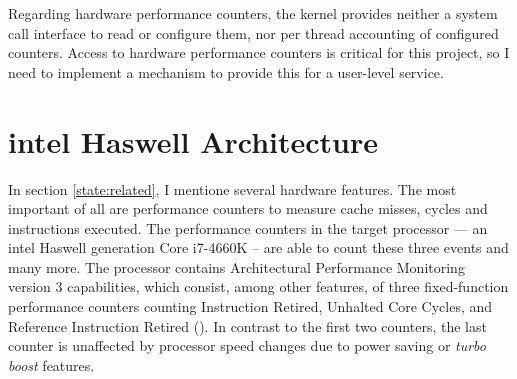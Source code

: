 Regarding hardware performance counters, the kernel provides neither a system
call interface to read or configure them, nor per thread accounting of
configured counters.
Access to hardware performance counters is critical for this project, so I need
to implement a mechanism to provide this for a user-level service.



\begin{comment}
\textbf{Fiasco.OC}
\begin{itemize}
  \item Kernel scheduler does no balancing, assigns thread to the first
    core specified in the affinity descriptor
  \item affinity descriptor: core(s) a thread should run on
  \item Syscall via run\_thread() to pass affinity descr to kernel scheduler
  \item interface to query execution time for each thread
  \item capability system -- to derive communication relationships from
  \item	Kernel feature wishes derived from related work: Performance counters
    and per thread accounting
\end{itemize}

\textbf{L4Re}
\begin{itemize}
  \item provides scheduler proxy interface, including affinity descriptor,
    scheduling parameters
  \item syscall interface
\end{itemize}
\end{comment}



\section{\gls{intel} Haswell Architecture}
\label{state:haswell}

In section \ref{state:related}, I mentione several hardware features.
The most important of all are performance counters to measure cache misses,
cycles and instructions executed.
The performance counters in the target processor --- an \gls{intel} Haswell
generation Core i7-4660K -- are able to count these three events and many more.
The processor contains Architectural Performance Monitoring version 3
capabilities, which consist, among other features, of three fixed-function
performance counters counting Instruction Retired, Unhalted Core Cycles, and
Reference Instruction Retired (\cite{intel_arch_ref_manual_2015}).
In contrast to the first two counters, the last counter is unaffected by
processor speed changes due to power saving or \textit{turbo boost} features.

